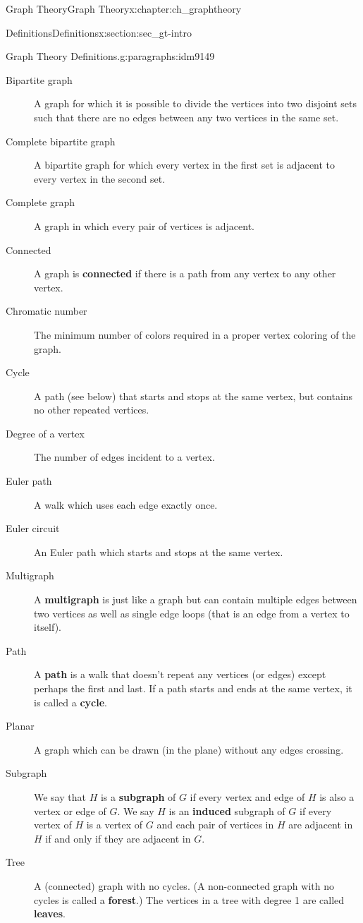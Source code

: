 \documentclass[oneside,10pt,]{book}
\newcommand{\terminology}[1]{\textbf{#1}}
\numberwithin{equation}{chapter}
\begin{document}
\begin{chapterptx}{Graph Theory}{}{Graph Theory}{}{}{x:chapter:ch_graphtheory}
\begin{sectionptx}{Definitions}{}{Definitions}{}{}{x:section:sec_gt-intro}
\begin{paragraphs}{Graph Theory Definitions.}{g:paragraphs:idm9149}
\begin{description}
\item[{Bipartite graph}] A graph for which it is possible to divide the vertices into two disjoint sets such that there are no edges between any two vertices in the same set.%
\item[{Complete bipartite graph}]A bipartite graph for which every vertex in the first set is adjacent to every vertex in the second set.%
\item[{Complete graph}] A graph in which every pair of vertices is adjacent.%
\item[{Connected}] A graph is \terminology{connected} if there is a path from any vertex to any other vertex.%
\item[{Chromatic number}] The minimum number of colors required in a proper vertex coloring of the graph.%
\item[{Cycle}] A path (see below) that starts and stops at the same vertex, but contains no other repeated vertices.%
\item[{Degree of a vertex}] The number of edges incident to a vertex.%
\item[{Euler path}]A walk which uses each edge exactly once.%
\item[{Euler circuit}] An Euler path which starts and stops at the same vertex.%
\item[{Multigraph}] A \terminology{multigraph} is just like a graph but can contain multiple edges between two vertices as well as single edge loops (that is an edge from a vertex to itself).%
\item[{Path}]A \terminology{path} is a walk that doesn't repeat any vertices (or edges) except perhaps the first and last.  If a path starts and ends at the same vertex, it is called a \terminology{cycle}.%
\item[{Planar}] A graph which can be drawn (in the plane) without any edges crossing.%
\item[{Subgraph}] We say that \(H\) is a \terminology{subgraph} of \(G\) if every vertex and edge of \(H\) is also a vertex or edge of \(G\). We say \(H\) is an \terminology{induced} subgraph of \(G\) if every vertex of \(H\) is a vertex of \(G\) and each pair of vertices in \(H\) are adjacent in \(H\) if and only if they are adjacent in \(G\).%
\item[{Tree}] A (connected) graph with no cycles. (A non-connected graph with no cycles is called a \terminology{forest}.) The vertices in a tree with degree 1 are called \terminology{leaves}.%

\end{description}
\end{paragraphs}
\end{sectionptx}
\end{chapterptx}
\end{document}
